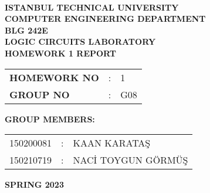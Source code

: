 \documentclass[pdftex,12pt,a4paper]{article}
\begin{document}
\begin{titlepage}
\begin{center}
\textbf{}\\
\textbf{\Large{ISTANBUL TECHNICAL UNIVERSITY}}\\
\vspace{0.5cm}
\textbf{\Large{COMPUTER ENGINEERING DEPARTMENT}}\\
\vspace{2cm}
\textbf{\Large{BLG 242E}}\\
\vspace{0.2cm}
\textbf{\Large{LOGIC CIRCUITS LABORATORY}}\\
\vspace{0.2cm}
\textbf{\Large{HOMEWORK 1 REPORT}}\\
\vspace{2cm}
\begin{table}[ht]
\centering
\Large{
\begin{tabular}{lcl}
\textbf{HOMEWORK NO}  & : & 1 \\
\textbf{GROUP NO}  & : & G08 \\
\end{tabular}}\end{table}\vspace{1cm}
\textbf{\Large{GROUP MEMBERS:}}\\
\begin{table}[ht]\centering\Large{
\begin{tabular}{rcl}
150200081  & : & KAAN KARATAŞ \\
150210719   & : & NACİ TOYGUN GÖRMÜŞ \\
\end{tabular}}
\end{table}
\vspace{2.8cm}
\textbf{\Large{SPRING 2023}}
\end{center}
\end{titlepage}
\end{document}
